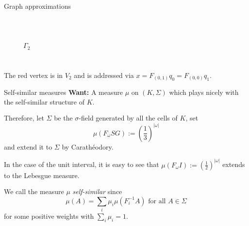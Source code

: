 \begin{frame}{Graph approximations}
\begin{example}
\begin{enumerate}
\begin{columns}[c]
\begin{figure}
\\
                \centering
                \(\Gamma_2 \)
            \end{figure}
        \end{columns}
    \end{enumerate}
    \end{example}
    The red vertex is in \(V_2 \) and is addressed via \(x = F_{(0, 1)}q_0 = F_{(0,0)}q_1 \).
\end{frame}

\begin{frame}{Self-similar measures}
    \textbf{Want:} A measure \(\mu \) on \((K, \Sigma) \) which plays nicely with the self-similar structure of \(K \).

    Therefore, let \(\Sigma \) be the \(\sigma \)-field generated by all the cells of \(K \), set
    \[ \mu(F_\omega SG) := \left(\frac{1}{3} \right)^{|\omega |} \]
    and extend it to \(\Sigma \) by Carathéodory.

    In the case of the unit interval, it is easy to see that \( \mu(F_\omega I) := \left( \frac{1}{2} \right)^{|\omega |} \) extends to the Lebesgue measure.

    \begin{definition}
        We call the measure \(\mu \) \textit{self-similar} since
        \[ \mu(A) = \sum_i \mu_i \mu(F_i^{-1} A) \text{ for all } A \in \Sigma \]
        for some positive weights with \(\sum_i \mu_i = 1 \).
    \end{definition}
\end{frame}

